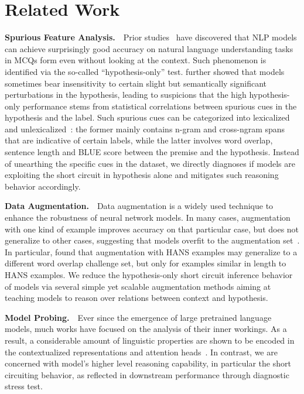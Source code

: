 \section{Related Work}


\textbf{Spurious Feature Analysis.}~~Prior studies~\cite{endingonly1,zellers2018swag} have discovered that NLP models can achieve surprisingly good accuracy on natural language understanding tasks in MCQs form even without looking at the context. 
Such phenomenon is identified via the so-called ``hypothesis-only'' test. \citeauthor{sanchez2018behavior} further showed that models sometimes bear insensitivity to certain slight but semantically significant perturbations in the hypothesis, leading to suspicions that the high hypothesis-only performance  stems from statistical correlations between spurious cues in the hypothesis and the label. Such spurious cues can be categorized into lexicalized~\cite{naik2018stress} and unlexicalized~\cite{bowman2015large}: the former mainly contains n-gram and cross-ngram spans that are indicative of certain labels, while the latter involves word overlap, sentence length and BLUE score between the premise and the hypothesis. Instead of unearthing the specific cues in the dataset, we directly diagnoses if models are exploiting the short circuit in hypothesis alone and mitigates such reasoning behavior accordingly.

\textbf{Data Augmentation.}~~Data augmentation is a widely used technique to enhance the robustness of neural network models. In many cases, augmentation with one kind of example improves accuracy on that particular case, but does not generalize to other cases, suggesting that models overfit to the augmentation set~\cite{Iyyer2018,Liu2019a}. In particular, \citeauthor{mccoy2019right} found that augmentation with HANS examples may generalize to a different word overlap challenge set, but only for examples similar in length to HANS examples. We reduce the hypothesis-only short circuit inference behavior of models via several simple yet scalable augmentation methods aiming at teaching models to reason over relations between context and hypothesis.

\textbf{Model Probing.}~~Ever since the emergence of large pretrained language models, much works have focused on the analysis of their inner workings. As a result, a considerable amount of linguistic properties are shown to be encoded in the contextualized representations and attention heads~\cite{goldberg2019,clark2019,liu-etal-2019-linguistic,tenny2019}. In contrast, we are concerned with model's higher level reasoning capability, in particular the short circuiting behavior, as reflected in downstream performance through diagnostic stress test.

